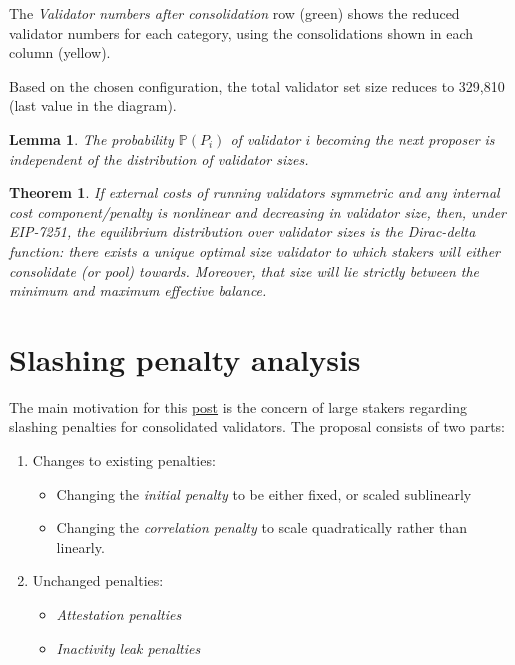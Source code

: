 \documentclass{article}
\newcommand{\prob}{\mathbb P}
\newtheorem{theorem}{Theorem}
\newtheorem{lemma}{Lemma}
\begin{document}
The \emph{Validator numbers after consolidation} row (green) shows the reduced validator numbers for each category, using the consolidations shown in each column (yellow).

Based on the chosen configuration, the total validator set size reduces to 329,810 (last value in the diagram).



\begin{lemma}
  The probability $\prob(P_i)$ of validator $i$ becoming the next proposer is
  independent of the distribution of validator sizes.
\end{lemma}

\begin{theorem}
  If external costs of running validators symmetric and any internal cost
  component/penalty is nonlinear and decreasing in validator size, then, under
  EIP-7251, the equilibrium distribution over validator sizes is the
  Dirac-delta function: there exists a unique optimal size validator to which stakers will
  either consolidate (or pool) towards. Moreover, that size will lie strictly
  between the minimum and maximum effective balance.
\end{theorem}

\section{Slashing penalty analysis}
The main motivation for this
\href{https://notes.ethereum.org/@mikeneuder/slashings-eip-7251}{post} is the
concern of large stakers regarding slashing penalties for consolidated
validators. The proposal consists of two parts:
\begin{enumerate}
  \item Changes to existing penalties:
    \begin{itemize}
      \item Changing the \textit{initial penalty} to be either fixed, or scaled
        sublinearly
      \item Changing the \textit{correlation penalty} to scale quadratically
        rather than linearly.
    \end{itemize}
  \item Unchanged penalties:
    \begin{itemize}
      \item \textit{Attestation penalties}
      \item \textit{Inactivity leak penalties}
    \end{itemize}
\end{enumerate}
\end{document}
